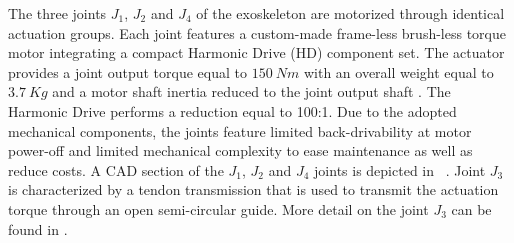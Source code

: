 \DIFaddend %
%
\DIFdelbegin %
{%
}
\DIFdelend %
%
\par The three joints $J_1$, $J_2$ and $J_4$ of the exoskeleton are motorized through identical actuation groups. Each joint features a custom-made frame-less brush-less torque motor integrating a compact Harmonic Drive (HD) component set. The actuator provides a joint output torque equal to $150\ Nm$ with an overall weight equal to $3.7\ Kg$ and a motor shaft inertia reduced to the joint output shaft \DIFdelbegin {}\DIFdelend \DIFaddbegin {}\DIFaddend . The Harmonic Drive performs a reduction equal to 100:1. Due to the adopted mechanical components, the joints feature limited back-drivability at motor power-off and limited mechanical complexity to ease maintenance as well as reduce costs. A CAD section of the $J_1$, $J_2$ and $J_4$ joints is depicted in \figurename \ \DIFdelbegin \DIFdel{\ref{fig:exosActuatorCAD}}\DIFdelend \DIFaddbegin {}\DIFaddend .
Joint $J_3$ is characterized by a tendon transmission that is used to transmit the actuation torque through an open semi-circular guide. More detail on the joint $J_3$ can be found in \cite{vertechy2009development}.

